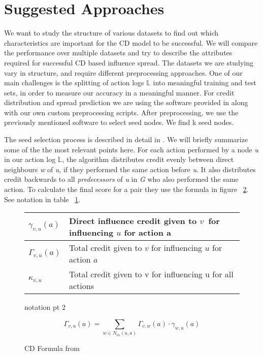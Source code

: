 \documentclass{acm_proc_article-sp}
\begin{document}
\section{Suggested Approaches}

We want to study the structure of various datasets to find out which characteristics are important for the CD model to be successful. We will compare the performance over multiple datasets and try to describe the attributes required for successful CD based influence spread. The datasets we are studying vary in structure, and require different preprocessing approaches. One of our main challenges is the splitting of action logs $\mathbb{L}$ into meaningful training and test sets, in order to measure our accuracy in a meaningful manner. For credit distribution and spread prediction we are using the software provided in \cite{goyal:datainfluence} along with our own custom preprocessing scripts.
After preprocessing, we use the previously mentioned software to select seed nodes. We find k seed nodes.


The seed selection process is described in detail in \cite{goyal:datainfluence}. We will briefly summarize some of the the most relevant points here. For each action performed by a node \textit{u} in our action log $\mathbb{L}$, the algorithm distributes credit evenly between direct neighbours \textit{w} of \textit{u}, if they performed the same action before \textit{u}. It also distributes credit backwards to all \textit{predecessors} of \textit{u} in \textit{G} who also performed the same action. To calculate the final score for a pair they use the formula in figure ~\ref{CD-formula}. See notation in table ~\ref{notation2}.

\begin{figure}[h]
	\begin{tabulary}{\linewidth}{|l|L|}
			\hline
			$\gamma_{v,u}(a)$ & Direct influence credit given to $v$ for influencing $u$ for action a \\\hline
			$\Gamma_{v,u}(a)$ & Total credit given to $v$ for influencing $u$ for action $a$ \\\hline
			$\kappa_{v,u}$ & Total credit given to v for influencing u for all actions \\\hline
	\end{tabulary}
	\caption{notation pt 2}
	\label{notation2}
\end{figure}


\begin{figure}[h]
	\begin{equation}
		\Gamma_{v,u}(a) = \displaystyle\sum_{w \in N_{in}(u,a)} \Gamma_{v,w}(a) \cdot \gamma_{w,u}(a)
	\end{equation}
	\caption{CD Formula from \cite{goyal:datainfluence}}
	\label{CD-formula}
\end{figure}
\end{document}
